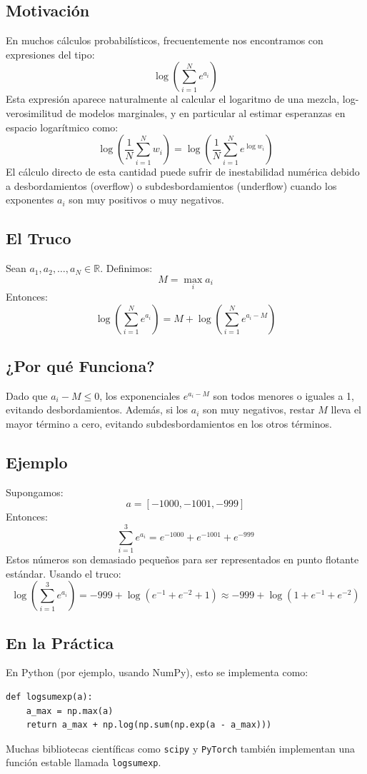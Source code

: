 \documentclass[12pt,spanish,mexico]{article}
\numberwithin{equation}{section}
\theoremstyle{definition}
\theoremstyle{remark}
\begin{document}
\subsection*{Motivación}
En muchos cálculos probabilísticos, frecuentemente nos encontramos con expresiones del tipo:
\[
\log \left( \sum_{i=1}^{N} e^{a_i} \right)
\]
Esta expresión aparece naturalmente al calcular el logaritmo de una mezcla, log-verosimilitud de modelos marginales, y en particular al estimar esperanzas en espacio logarítmico como:
\[
\log \left( \frac{1}{N} \sum_{i=1}^{N} w_i \right) = \log \left( \frac{1}{N} \sum_{i=1}^{N} e^{\log w_i} \right)
\]
El cálculo directo de esta cantidad puede sufrir de inestabilidad numérica debido a desbordamientos (overflow) o subdesbordamientos (underflow) cuando los exponentes $a_i$ son muy positivos o muy negativos.

\subsection*{El Truco}
Sean $a_1, a_2, \ldots, a_N \in \mathbb{R}$. Definimos:
\[
M = \max_i a_i
\]
Entonces:
\[
\log\left(\sum_{i=1}^{N} e^{a_i}\right) = M + \log\left(\sum_{i=1}^{N} e^{a_i - M}\right)
\]

\subsection*{¿Por qué Funciona?}
Dado que $a_i - M \leq 0$, los exponenciales $e^{a_i - M}$ son todos menores o iguales a 1, evitando desbordamientos. Además, si los $a_i$ son muy negativos, restar $M$ lleva el mayor término a cero, evitando subdesbordamientos en los otros términos.

\subsection*{Ejemplo}
Supongamos:
\[
a = [-1000, -1001, -999]
\]
Entonces:
\[
\sum_{i=1}^{3} e^{a_i} = e^{-1000} + e^{-1001} + e^{-999}
\]
Estos números son demasiado pequeños para ser representados en punto flotante estándar. Usando el truco:
\[
\log\left(\sum_{i=1}^{3} e^{a_i}\right) = -999 + \log\left(e^{-1} + e^{-2} + 1\right) \approx -999 + \log\left(1 + e^{-1} + e^{-2}\right)
\]

\subsection*{En la Práctica}
En Python (por ejemplo, usando NumPy), esto se implementa como:
\begin{verbatim}
def logsumexp(a):
    a_max = np.max(a)
    return a_max + np.log(np.sum(np.exp(a - a_max)))
\end{verbatim}
Muchas bibliotecas científicas como \texttt{scipy} y \texttt{PyTorch} también implementan una función estable llamada \texttt{logsumexp}.
\end{document}
